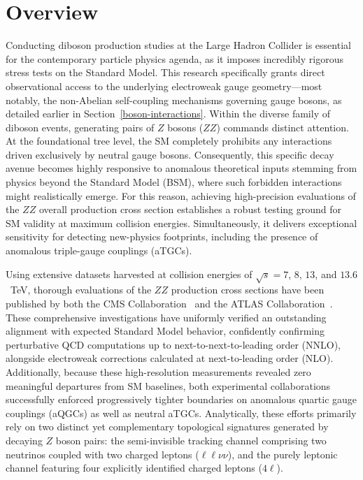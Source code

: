 


\section{Overview}
\label{sec:ZZ_intro}

Conducting diboson production studies at the Large Hadron Collider is essential for the contemporary particle physics agenda, as it imposes incredibly rigorous stress tests on the Standard Model. This research specifically grants direct observational access to the underlying electroweak gauge geometry—most notably, the non-Abelian self-coupling mechanisms governing gauge bosons, as detailed earlier in Section~\ref{boson-interactions}.
%
Within the diverse family of diboson events, generating pairs of $Z$ bosons ($ZZ$) commands distinct attention. At the foundational tree level, the SM completely prohibits any interactions driven exclusively by neutral gauge bosons. Consequently, this specific decay avenue becomes highly responsive to anomalous theoretical inputs stemming from physics beyond the Standard Model (BSM), where such forbidden interactions might realistically emerge.
%
For this reason, achieving high-precision evaluations of the $ZZ$ overall production cross section establishes a robust testing ground for SM validity at maximum collision energies. Simultaneously, it delivers exceptional sensitivity for detecting new-physics footprints, including the presence of anomalous triple-gauge couplings (aTGCs).

Using extensive datasets harvested at collision energies of $\sqrt{s} = 7$, $8$, $13$, and $13.6$~TeV, thorough evaluations of the $ZZ$ production cross sections have been published by both the CMS Collaboration~\cite{CMS-SMP-12-007, CMS-SMP-13-005, CMS-SMP-16-001, CMS-SMP-19-001} and the ATLAS Collaboration~\cite{ATLAS:2013zz,ATLAS:2017zz,ATLAS:2018zz,STDM-2017-03,STDM-2022-17,ATLAS:2024zz_13p6}. 
These comprehensive investigations have uniformly verified an outstanding alignment with expected Standard Model behavior, confidently confirming perturbative QCD computations up to next-to-next-to-leading order (NNLO), alongside electroweak corrections calculated at next-to-leading order (NLO). Additionally, because these high-resolution measurements revealed zero meaningful departures from SM baselines, both experimental collaborations successfully enforced progressively tighter boundaries on anomalous quartic gauge couplings (aQGCs) as well as neutral aTGCs. Analytically, these efforts primarily rely on two distinct yet complementary topological signatures generated by decaying $Z$ boson pairs: the semi-invisible tracking channel comprising two neutrinos coupled with two charged leptons ($\ell\ell\nu\nu$), and the purely leptonic channel featuring four explicitly identified charged leptons ($4\ell$).

